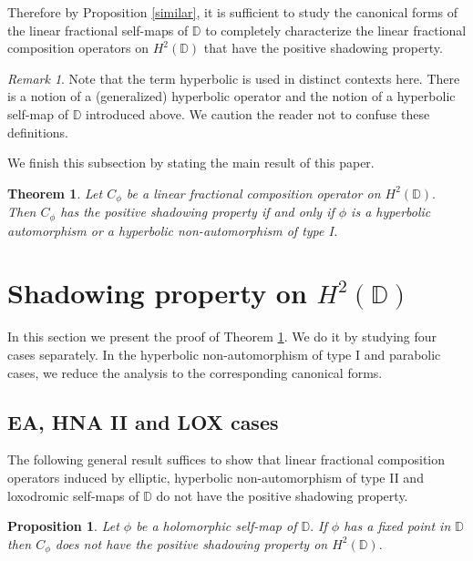 \documentclass[11pt]{amsart}
\theoremstyle{plain}
\newtheorem{theorem}[definition]{Theorem}
\newtheorem{proposition}[definition]{Proposition}
\theoremstyle{remark}
\newtheorem{remark}[definition]{Remark}
\theoremstyle{plain}
\begin{document}
Therefore by Proposition \ref{similar}, it is sufficient to study the canonical forms of the linear fractional self-maps of $\mathbb{D}$ to completely characterize the linear fractional composition operators on $H^2(\mathbb{D})$ that have the  positive shadowing property.

\begin{remark}
   Note that the term hyperbolic is used in distinct contexts here. There is a notion of a (generalized) hyperbolic operator and the notion of a hyperbolic  self-map of $\mathbb{D}$ introduced above. We caution the reader not to confuse these definitions. 
\end{remark}

We finish this subsection by stating the main result of this paper.

 \begin{theorem}\label{Theorem} Let $C_{\phi}$ be a linear fractional composition operator on $H^2(\mathbb{D}).$ Then $C_{\phi}$ has the positive shadowing property if and only if $\phi$ is a hyperbolic automorphism or a hyperbolic non-automorphism of type I.
 \end{theorem}


\section{Shadowing property on \texorpdfstring{$H^{2}(\mathbb{D})$}{H2(D)}}\label{section 3}

In this section we present the proof of Theorem \ref{Theorem}. We do it by studying four cases separately. In the hyperbolic non-automorphism of type I and parabolic cases, we reduce the analysis to the corresponding canonical forms.


\subsection{EA, HNA II and LOX cases} The following general result suffices to show that linear fractional composition operators induced by elliptic, hyperbolic non-automorphism of type II and loxodromic self-maps of $\mathbb{D}$ do not have the positive shadowing property.



\begin{proposition}\label{loxodromic-elliptic}
Let $\phi$ be a holomorphic self-map of $\mathbb{D}.$ If $\phi$ has a fixed point in $\mathbb{D}$ then $C_{\phi}$ does not have the positive shadowing property on $H^2(\mathbb{D}).$ 
\end{proposition}
\end{document}
